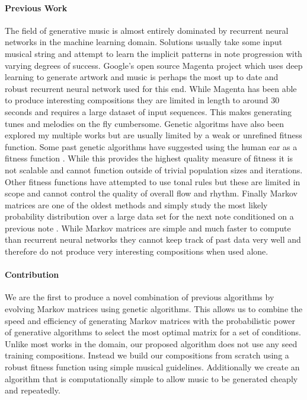 \documentclass{article}
\begin{document}
\paragraph{Previous Work} The field of generative music is almost entirely dominated by recurrent neural networks in the machine learning domain. Solutions usually take some input musical string and attempt to learn the implicit patterns in note progression with varying degrees of success. Google's open source Magenta project \cite{weydeperception} which uses deep learning to generate artwork and music is perhaps the most up to date and robust recurrent neural network used for this end. While Magenta has been able to produce interesting compositions they are limited in length to around 30 seconds and requires a large dataset of input sequences. This makes generating tunes and melodies on the fly cumbersome. Genetic algoritms have also been explored my multiple works but are usually limited by a weak or unrefined fitness function. Some past genetic algorithms have suggested using the human ear as a fitness function \cite{miranda2001composing}. While this provides the highest quality measure of fitness it is not scalable and cannot function outside of trivial population sizes and iterations. Other fitness functions have attempted to use tonal rules \cite{matic2013genetic} but these are limited in scope and cannot control the quality of overall flow and rhythm. Finally Markov matrices are one of the oldest methods and simply study the most likely probability distribution over a large data set for the next note conditioned on a previous note \cite{fernandez2013ai}. While Markov matrices are simple and much faster to compute than recurrent neural networks they cannot keep track of past data very well and therefore do not produce very interesting compositions when used alone.

\paragraph{Contribution} We are the first to produce a novel combination of previous algorithms by evolving Markov matrices using genetic algorithms. This allows us to combine the speed and efficiency of generating Markov matrices with the probabilistic power of generative algorithms to select the most optimal matrix for a set of conditions. Unlike most works in the domain, our proposed algorithm does not use any seed training compositions. Instead we build our compositions from scratch using a robust fitness function using simple musical guidelines. Additionally we create an algorithm that is computationally simple to allow music to be generated cheaply and repeatedly.
\end{document}
